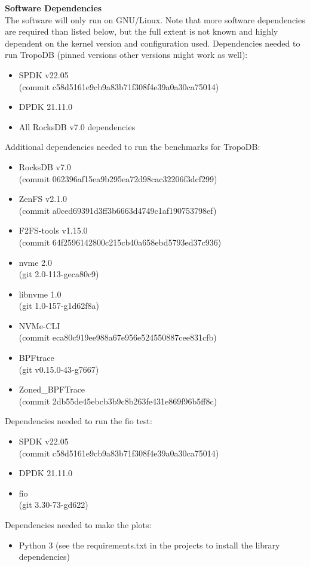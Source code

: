 \textbf{Software Dependencies}\\
The software will only run on GNU/Linux. Note that more software dependencies are required than listed below, but the full extent is not known and highly dependent on the kernel version and configuration used. Dependencies needed to run TropoDB (pinned versions other versions might work as well):
\begin{itemize}
    \item SPDK v22.05 \\(commit c58d5161e9cb9a83b71f308f4e39a0a30ca75014)
    \item DPDK 21.11.0
    \item All RocksDB v7.0 dependencies
\end{itemize}
Additional dependencies needed to run the benchmarks for TropoDB:
\begin{itemize}
    \item RocksDB v7.0 \\(commit 062396af15ea9b295ea72d98cac32206f3dcf299)
    \item ZenFS v2.1.0 \\(commit a0ced69391d3ff3b6663d4749c1af190753798ef)
    \item F2FS-tools v1.15.0 \\(commit  64f2596142800c215cb40a658ebd5793ed37c936)
    \item nvme 2.0 \\(git 2.0-113-geca80c9)
    \item libnvme 1.0 \\(git 1.0-157-g1d62f8a)
    \item NVMe-CLI \\(commit eca80c919ee988a67e956e524550887cee831cfb)
    \item BPFtrace \\(git v0.15.0-43-g7667)
    \item Zoned\_BPFTrace \\(commit 2db55de45ebcb3b9c8b263fe431e869f96b5ff8c)
    
\end{itemize}
Dependencies needed to run the fio test:
\begin{itemize}
    \item SPDK v22.05 \\(commit c58d5161e9cb9a83b71f308f4e39a0a30ca75014)
    \item DPDK 21.11.0
    \item fio \\(git 3.30-73-gd622)
\end{itemize}
Dependencies needed to make the plots:
\begin{itemize}
    \item Python 3 (see the requirements.txt in the projects to install the library dependencies)
\end{itemize}

